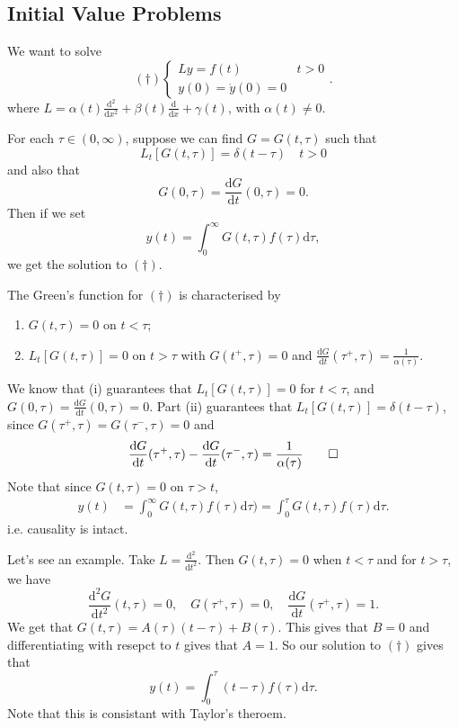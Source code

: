 \documentclass{article}
\begin{document}
\subsection{Initial Value Problems}
We want to solve
\[
	(\dagger)\begin{cases}
		Ly=f(t) & t>0 \\
		y(0)=\dot y(0)=0
	\end{cases}.
\]
where $ L =\alpha(t)\frac{\mathrm d^2}{\mathrm dx^2}+\beta(t)\frac{\mathrm d}{\mathrm dx}+\gamma(t) $, with $ \alpha(t)\ne 0 $.\par
For each $ \tau\in (0,\infty) $, suppose we can find $ G=G(t,\tau) $ such that
\[
	L_t[G(t,\tau)]=\delta(t-\tau)\quad t>0
\]
and also that
\[
	G(0,\tau)=\frac{\mathrm dG}{\mathrm dt}(0,\tau)=0.
\]
Then if we set
\[
  y(t)=\int_0^\infty G(t,\tau)f(\tau)\mathrm d\tau,
\]
we get the solution to $ (\dagger) $.
\begin{proposition}
  The Green's function for $ (\dagger) $ is characterised by
  \begin{enumerate}
	  \item $ G(t,\tau)=0 $ on $ t< \tau $;
	  \item $ L_t[G(t,\tau)]=0 $ on $ t>\tau $ with $ G(t^+,\tau)=0 $ and $ \frac{\mathrm dG}{\mathrm dt}(\tau^+,\tau)=\frac1{\alpha(\tau)} $.
  \end{enumerate}
\end{proposition}
\pf We know that (i) guarantees that $ L_t[G(t,\tau)]=0 $ for $ t<\tau $, and $ G(0,\tau) =\frac{\mathrm dG}{\mathrm dt}(0,\tau)=0 $. Part (ii) guarantees that $ L_t[G(t,\tau)]=\delta(t-\tau) $, since $ G(\tau^+,\tau)=G(\tau^-,\tau)=0 $ and
\[
	\frac{\mathrm dG}{\mathrm dt}(\tau^+,\tau)-\frac{\mathrm dG}{\mathrm dt}(\tau^-,\tau)=\frac1{\alpha(\tau)}\qed
\]
Note that since $ G(t,\tau)=0 $ on $ \tau>t $,
\begin{align*}
	y(t) &= \int_0^\infty G(t,\tau)f(\tau)\mathrm d\tau)=\int_0^\tau G(t,\tau)f(\tau)\mathrm d\tau.
\end{align*}
i.e. causality is intact.\par
Let's see an example. Take $ L=\frac{\mathrm d^2}{\mathrm dt^2} $. Then $ G(t,\tau)=0 $ when $ t<\tau $ and for $ t>\tau $, we have
\[
\frac{\mathrm d^2 G}{\mathrm dt^2}(t,\tau)=0,\quad G(\tau^+,\tau)=0,\quad \frac{\mathrm dG}{\mathrm dt}(\tau^+,\tau)=1.
\]
We get that $ G(t,\tau)=A(\tau)(t-\tau)+B(\tau) $. This gives that $ B=0 $ and differentiating with resepct to $ t $ gives that $ A=1 $. So our solution to $ (\dagger) $ gives that
\[
  y(t)=\int_0^\tau (t-\tau)f(\tau)\mathrm d\tau.
\]
Note that this is consistant with Taylor's theroem.
\end{document}
